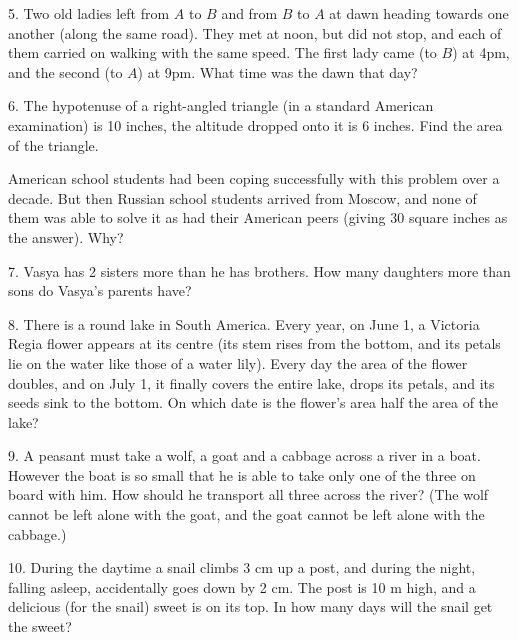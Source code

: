\begin{problem}{5.}
	Two old ladies left from $A$ to $B$ and from $B$ to $A$ at dawn
	heading towards one another (along the same road). They met at noon,
	but did not stop, and each of them carried on walking with the same speed.
	The first lady came (to $B$) at 4pm, and the second (to $A$) at 9pm. What time was the dawn that day? 
\end{problem}

\begin{problem}{6.}
	The hypotenuse of a right-angled triangle (in a standard American examination) is 10 inches,
	the altitude dropped onto it is 6 inches. Find the area of the triangle.

	American school students had been coping successfully with this problem over a decade.
	But then Russian school students arrived from Moscow, and none of them was able to solve it as had their American peers
	(giving 30 square inches as the answer). Why? 
\end{problem}

\begin{problem}{7.}
	Vasya has 2 sisters more than he has brothers. How many daughters more than sons do Vasya's parents have?
\end{problem}

\begin{problem}{8.}
	There is a round lake in South America. Every year, on June 1, a Victoria Regia flower appears at its
	centre (its stem rises from the bottom, and its petals lie on the water like those of a water lily). Every day
	the area of the flower doubles, and on July 1, it finally covers the entire lake, drops its petals, and its seeds
	sink to the bottom. On which date is the flower's area half the area of the lake?    
\end{problem}

\begin{problem}{9.}
	A peasant must take a wolf, a goat and a cabbage across a river in a boat. However the boat is so small that
	he is able to take only one of the three on board with him. How should he transport all three across
	the river? (The wolf cannot be left alone with the goat, and the goat cannot be left alone with the cabbage.)
\end{problem}

\begin{problem}{10.}
	During the daytime a snail climbs 3 cm up a post, and during the night, falling asleep, accidentally
	goes down by 2 cm. The post is 10 m high, and a delicious (for the snail) sweet is on its top.
	In how many days will the snail get the sweet?
\end{problem}

